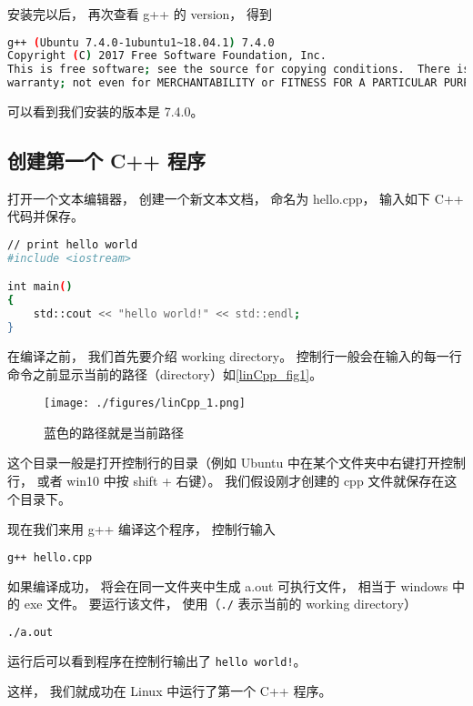 安装完以后， 再次查看 g++ 的 version， 得到
\begin{lstlisting}[language=bash]
g++ (Ubuntu 7.4.0-1ubuntu1~18.04.1) 7.4.0
Copyright (C) 2017 Free Software Foundation, Inc.
This is free software; see the source for copying conditions.  There is NO
warranty; not even for MERCHANTABILITY or FITNESS FOR A PARTICULAR PURPOSE.
\end{lstlisting}
可以看到我们安装的版本是 7.4.0。


\subsection{创建第一个 C++ 程序}
打开一个文本编辑器， 创建一个新文本文档， 命名为 hello.cpp， 输入如下 C++ 代码并保存。
\begin{lstlisting}[language=bash]
// print hello world
#include <iostream>

int main()
{
    std::cout << "hello world!" << std::endl;
}
\end{lstlisting}
在编译之前， 我们首先要介绍 working directory。 控制行一般会在输入的每一行命令之前显示当前的路径（directory）如\autoref{linCpp_fig1}。
\begin{figure}[ht]
\centering
\texttt{[image: ./figures/linCpp\_1.png]}
\caption{蓝色的路径就是当前路径} \label{linCpp_fig1}
\end{figure}

这个目录一般是打开控制行的目录（例如 Ubuntu 中在某个文件夹中右键打开控制行， 或者 win10 中按 shift + 右键）。 我们假设刚才创建的 cpp 文件就保存在这个目录下。

现在我们来用 g++ 编译这个程序， 控制行输入
\begin{lstlisting}[language=bash]
g++ hello.cpp
\end{lstlisting}
如果编译成功， 将会在同一文件夹中生成 a.out 可执行文件， 相当于 windows 中的 exe 文件。 要运行该文件， 使用（\verb|./| 表示当前的 working directory）
\begin{lstlisting}[language=bash]
./a.out
\end{lstlisting}
运行后可以看到程序在控制行输出了 \verb|hello world!|。

这样， 我们就成功在 Linux 中运行了第一个 C++ 程序。
